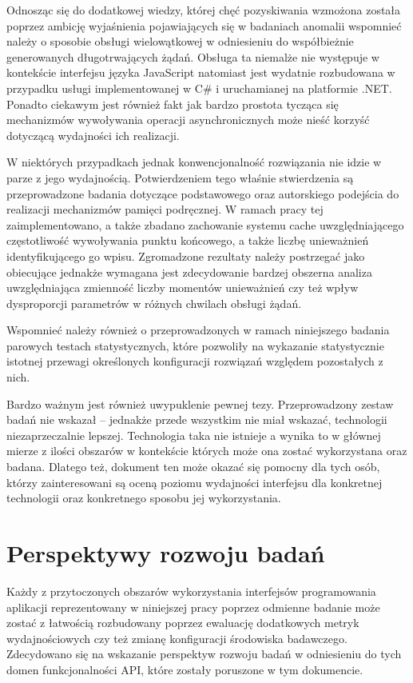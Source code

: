 Odnosząc się do dodatkowej wiedzy, której chęć pozyskiwania wzmożona została poprzez ambicję wyjaśnienia pojawiających się w badaniach anomalii wspomnieć należy o sposobie obsługi wielowątkowej w odniesieniu do współbieżnie generowanych długotrwających żądań. Obsługa ta niemalże nie występuje w kontekście interfejsu języka JavaScript natomiast jest wydatnie rozbudowana w przypadku usługi implementowanej w C\# i uruchamianej na platformie .NET. Ponadto ciekawym jest również fakt jak bardzo prostota tycząca się mechanizmów wywoływania operacji asynchronicznych może nieść korzyść dotyczącą wydajności ich realizacji.

W niektórych przypadkach jednak konwencjonalność rozwiązania nie idzie w parze z jego wydajnością. Potwierdzeniem tego właśnie stwierdzenia są przeprowadzone badania dotyczące podstawowego oraz autorskiego podejścia do realizacji mechanizmów pamięci podręcznej. W ramach pracy tej zaimplementowano, a także zbadano zachowanie systemu cache uwzględniającego częstotliwość wywoływania punktu końcowego, a także liczbę unieważnień identyfikującego go wpisu. Zgromadzone rezultaty należy postrzegać jako obiecujące jednakże wymagana jest zdecydowanie bardzej obszerna analiza uwzględniająca zmienność liczby momentów unieważnień czy też wpływ dysproporcji parametrów w różnych chwilach obsługi żądań.

Wspomnieć należy również o przeprowadzonych w ramach niniejszego badania parowych testach statystycznych, które pozwoliły na wykazanie statystycznie istotnej przewagi określonych konfiguracji rozwiązań względem pozostałych z nich. 

Bardzo ważnym jest również uwypuklenie pewnej tezy. Przeprowadzony zestaw badań nie wskazał -- jednakże przede wszystkim nie miał wskazać, technologii niezaprzeczalnie lepszej. Technologia taka nie istnieje a wynika to w głównej mierze z ilości obszarów w kontekście których może ona zostać wykorzystana oraz badana. Dlatego też, dokument ten może okazać się pomocny dla tych osób, którzy zainteresowani są oceną poziomu wydajności interfejsu dla konkretnej technologii oraz konkretnego sposobu jej wykorzystania.
\section{Perspektywy rozwoju badań}
Każdy z przytoczonych obszarów wykorzystania interfejsów programowania aplikacji reprezentowany w niniejszej pracy poprzez odmienne badanie może zostać z łatwością rozbudowany poprzez ewaluację dodatkowych metryk wydajnościowych czy też zmianę konfiguracji środowiska badawczego. Zdecydowano się na wskazanie perspektyw rozwoju badań w odniesieniu do tych domen funkcjonalności API, które zostały poruszone w tym dokumencie.

